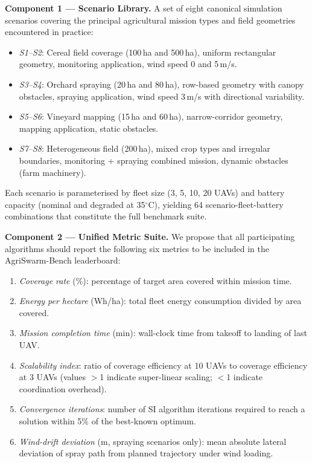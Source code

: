 \documentclass[review,3p,times]{elsarticle}
\begin{document}
\textbf{Component 1 --- Scenario Library.} A set of eight canonical simulation scenarios covering the principal agricultural mission types and field geometries encountered in practice:
\begin{itemize}
  \item \textit{S1--S2}: Cereal field coverage (100\,ha and 500\,ha), uniform rectangular geometry, monitoring application, wind speed 0 and 5\,m/s.
  \item \textit{S3--S4}: Orchard spraying (20\,ha and 80\,ha), row-based geometry with canopy obstacles, spraying application, wind speed 3\,m/s with directional variability.
  \item \textit{S5--S6}: Vineyard mapping (15\,ha and 60\,ha), narrow-corridor geometry, mapping application, static obstacles.
  \item \textit{S7--S8}: Heterogeneous field (200\,ha), mixed crop types and irregular boundaries, monitoring + spraying combined mission, dynamic obstacles (farm machinery).
\end{itemize}
Each scenario is parameterised by fleet size (3, 5, 10, 20 UAVs) and battery capacity (nominal and degraded at 35$^\circ$C), yielding 64 scenario-fleet-battery combinations that constitute the full benchmark suite.

\textbf{Component 2 --- Unified Metric Suite.} We propose that all participating algorithms should report the following six metrics to be included in the AgriSwarm-Bench leaderboard:
\begin{enumerate}
  \item \textit{Coverage rate} (\%): percentage of target area covered within mission time.
  \item \textit{Energy per hectare} (Wh/ha): total fleet energy consumption divided by area covered.
  \item \textit{Mission completion time} (min): wall-clock time from takeoff to landing of last UAV.
  \item \textit{Scalability index}: ratio of coverage efficiency at 10 UAVs to coverage efficiency at 3 UAVs (values $>$1 indicate super-linear scaling; $<$1 indicate coordination overhead).
  \item \textit{Convergence iterations}: number of SI algorithm iterations required to reach a solution within 5\% of the best-known optimum.
  \item \textit{Wind-drift deviation} (m, spraying scenarios only): mean absolute lateral deviation of spray path from planned trajectory under wind loading.
\end{enumerate}
\end{document}
